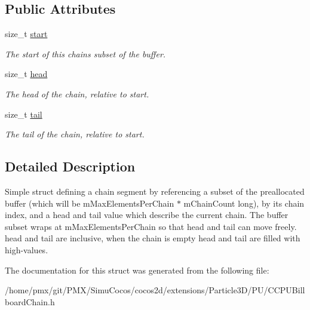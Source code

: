 \subsection*{Public Attributes}
\begin{DoxyCompactItemize}
\item 
\mbox{\label{structPUBillboardChain_1_1ChainSegment_ae66743b993223a22527f9ac18a6abe91}} 
size\+\_\+t \hyperlink{structPUBillboardChain_1_1ChainSegment_ae66743b993223a22527f9ac18a6abe91}{start}
\begin{DoxyCompactList}\small\item\em The start of this chains subset of the buffer. \end{DoxyCompactList}\item 
\mbox{\label{structPUBillboardChain_1_1ChainSegment_abfeef23833826a7721e7266e0614b214}} 
size\+\_\+t \hyperlink{structPUBillboardChain_1_1ChainSegment_abfeef23833826a7721e7266e0614b214}{head}
\begin{DoxyCompactList}\small\item\em The \textquotesingle{}head\textquotesingle{} of the chain, relative to start. \end{DoxyCompactList}\item 
\mbox{\label{structPUBillboardChain_1_1ChainSegment_a5115c518ff4ad48f21b0e72d638b2429}} 
size\+\_\+t \hyperlink{structPUBillboardChain_1_1ChainSegment_a5115c518ff4ad48f21b0e72d638b2429}{tail}
\begin{DoxyCompactList}\small\item\em The \textquotesingle{}tail\textquotesingle{} of the chain, relative to start. \end{DoxyCompactList}\end{DoxyCompactItemize}


\subsection{Detailed Description}
Simple struct defining a chain segment by referencing a subset of the preallocated buffer (which will be m\+Max\+Elements\+Per\+Chain $\ast$ m\+Chain\+Count long), by it\textquotesingle{}s chain index, and a head and tail value which describe the current chain. The buffer subset wraps at m\+Max\+Elements\+Per\+Chain so that head and tail can move freely. head and tail are inclusive, when the chain is empty head and tail are filled with high-\/values. 

The documentation for this struct was generated from the following file\+:\begin{DoxyCompactItemize}
\item 
/home/pmx/git/\+P\+M\+X/\+Simu\+Cocos/cocos2d/extensions/\+Particle3\+D/\+P\+U/C\+C\+P\+U\+Billboard\+Chain.\+h\end{DoxyCompactItemize}
